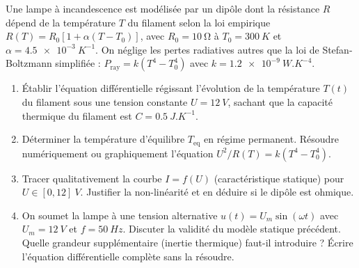 \documentclass[11pt]{article}
\begin{document}
\begin{exercice}
Une lampe à incandescence est modélisée par un dipôle dont la résistance $R$ dépend de la température $T$ du filament selon la loi empirique $R(T) = R_0[1 + \alpha(T-T_0)]$, avec $R_0 = \SI{10}{\ohm}$ à $T_0 = \SI{300}{K}$ et $\alpha = \SI{4,5e-3}{K^{-1}}$. On néglige les pertes radiatives autres que la loi de Stefan-Boltzmann simplifiée : $P_{\text{ray}} = k(T^4 - T_0^4)$ avec $k = \SI{1,2e-9}{W.K^{-4}}$.
\begin{enumerate}
    \item Établir l'équation différentielle régissant l'évolution de la température $T(t)$ du filament sous une tension constante $U = \SI{12}{V}$, sachant que la capacité thermique du filament est $C = \SI{0,5}{J.K^{-1}}$.
    \item Déterminer la température d'équilibre $T_{\text{eq}}$ en régime permanent. Résoudre numériquement ou graphiquement l'équation $U^2/R(T) = k(T^4-T_0^4)$.
    \item Tracer qualitativement la courbe $I=f(U)$ (caractéristique statique) pour $U \in [0, 12]~\si{V}$. Justifier la non-linéarité et en déduire si le dipôle est ohmique.
    \item On soumet la lampe à une tension alternative $u(t) = U_m \sin(\omega t)$ avec $U_m = \SI{12}{V}$ et $f = \SI{50}{Hz}$. Discuter la validité du modèle statique précédent. Quelle grandeur supplémentaire (inertie thermique) faut-il introduire ? Écrire l'équation différentielle complète sans la résoudre.
\end{enumerate}
\end{exercice}
\end{document}
